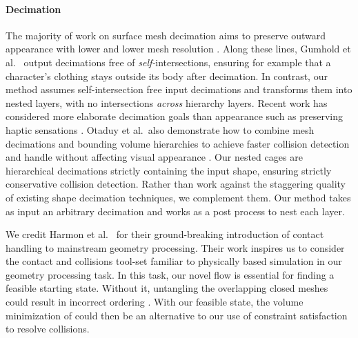 \paragraph{Decimation}
%
The majority of work on surface mesh decimation aims to preserve outward
appearance with lower and lower mesh resolution
\cite{Hoppe:1996:PM,Garland:1997:SSU,Melax98}.
%
Along these lines, Gumhold et al.\  output decimations free of
\emph{self-}intersections, ensuring for example that a character's clothing
stays outside its body after decimation.
%
In contrast, our method assumes self-intersection free input decimations and
transforms them into nested layers, with no intersections \emph{across}
hierarchy layers.
%
Recent work has considered more elaborate decimation goals than appearance such
as preserving haptic sensations \cite{Otaduy:2003:SPS}.
%
Otaduy et al.\ also demonstrate how to combine mesh decimations and bounding
volume hierarchies to achieve faster collision detection and handle without
affecting visual appearance .
%
Our nested cages are hierarchical decimations strictly containing the input
shape, ensuring strictly conservative collision detection.
%
Rather than work against the staggering quality of existing shape decimation
techniques, we complement them. Our method takes as input an arbitrary
decimation and works as a post process to nest each layer.




We credit Harmon et al.\  for their
ground-breaking introduction of contact handling to mainstream geometry
processing. Their work inspires us to consider the contact and collisions
tool-set familiar to physically based simulation in our geometry processing
task.
%
In this task, our novel flow is essential for finding a feasible starting
state.
%
Without it, untangling the overlapping closed meshes could result in incorrect
ordering \cite{Baraff:2003:UC}.
%
With our feasible state, the volume minimization of
\cite{ContactAwareModeling:2011} could then be an alternative to our use of
constraint satisfaction to resolve collisions.
